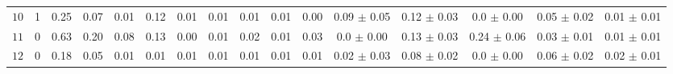\begin{tabular}{l|cc|cccccccc|ccccc}
 $10$  & 1 & 0.25 & 0.07 & 0.01 & 0.12 & 0.01 & 0.01 & 0.01 & 0.01 & 0.00 & 0.09 $\pm$ 0.05 & 0.12 $\pm$ 0.03 & 0.0 $\pm$ 0.00 & 0.05 $\pm$ 0.02 & 0.01 $\pm$ 0.01 \\ 
 $11$  & 0 & 0.63 & 0.20 & 0.08 & 0.13 & 0.00 & 0.01 & 0.02 & 0.01 & 0.03 & 0.0 $\pm$ 0.00 & 0.13 $\pm$ 0.03 & 0.24 $\pm$ 0.06 & 0.03 $\pm$ 0.01 & 0.01 $\pm$ 0.01 \\ 
 $12$  & 0 & 0.18 & 0.05 & 0.01 & 0.01 & 0.01 & 0.01 & 0.01 & 0.01 & 0.01 & 0.02 $\pm$ 0.03 & 0.08 $\pm$ 0.02 & 0.0 $\pm$ 0.00 & 0.06 $\pm$ 0.02 & 0.02 $\pm$ 0.01 \\ 
\end{tabular} 
